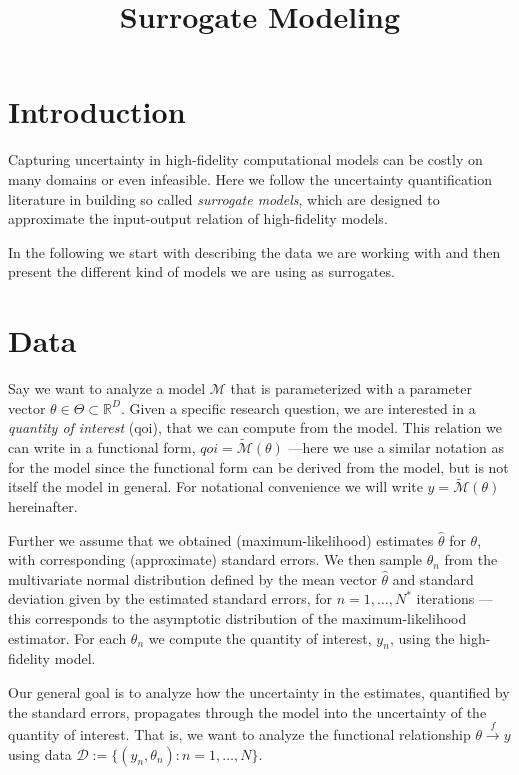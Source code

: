 \documentclass[a4paper, 12pt]{article}
\title{Surrogate Modeling}
\date{}
\begin{document}
\maketitle

\section{Introduction}

Capturing uncertainty in high-fidelity computational models can be costly on many domains or even infeasible.
Here we follow the uncertainty quantification literature in building so called \textit{surrogate models}, which are designed to approximate the input-output relation of high-fidelity models.

In the following we start with describing the data we are working with and then present the different kind of models we are using as surrogates.

\section{Data}

Say we want to analyze a model $\mathcal{M}$ that is parameterized with a parameter vector $\theta \in \Theta \subset \mathbb{R}^D$.
Given a specific research question, we are interested in a \textit{quantity of interest} (qoi), that we can compute from the model.
This relation we can write in a functional form, $qoi = \tilde{\mathcal{M}}(\theta)$ ---here we use a similar notation as for the model since the functional form can be derived from the model, but is not itself the model in general.
For notational convenience we will write $y = \tilde{\mathcal{M}}(\theta)$ hereinafter.

Further we assume that we obtained (maximum-likelihood) estimates $\hat{\theta}$ for $\theta$, with corresponding (approximate) standard errors.
We then sample $\theta_n$ from the multivariate normal distribution defined by the mean vector $\hat{\theta}$ and standard deviation given by the estimated standard errors, for $n=1,\dots,N^*$ iterations ---this corresponds to the asymptotic distribution of the maximum-likelihood estimator.
For each $\theta_n$ we compute the quantity of interest, $y_n$, using the high-fidelity model.

Our general goal is to analyze how the uncertainty in the estimates, quantified by the standard errors, propagates through the model into the uncertainty of the quantity of interest.
That is, we want to analyze the functional relationship $\theta \overset{f}{\longrightarrow} y$ using data $\mathcal{D} := \{(y_n, \theta_n) : n=1,\dots, N\}$.
\end{document}
